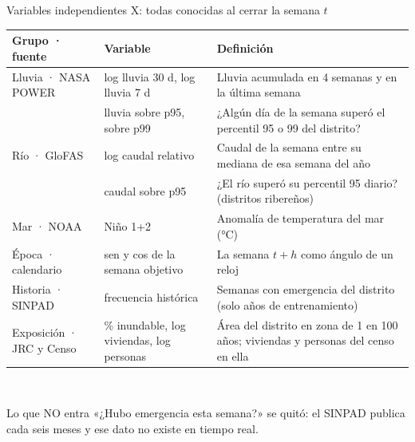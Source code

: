 \documentclass[aspectratio=169,11pt]{beamer}
\begin{document}
\begin{frame}{Variables independientes X: todas conocidas al cerrar la semana $t$}
\tiny
\begin{tabularx}{\textwidth}{@{}l l X@{}}
\toprule
\textbf{Grupo · fuente} & \textbf{Variable} & \textbf{Definición}\\\midrule
Lluvia · NASA POWER & log lluvia 30 d, log lluvia 7 d & Lluvia acumulada en 4 semanas y en la última semana\\
 & lluvia sobre p95, sobre p99 & ¿Algún día de la semana superó el percentil 95 o 99 del distrito?\\
Río · GloFAS & log caudal relativo & Caudal de la semana entre su mediana de esa semana del año\\
 & caudal sobre p95 & ¿El río superó su percentil 95 diario? (distritos ribereños)\\
Mar · NOAA & Niño 1+2 & Anomalía de temperatura del mar (°C)\\
Época · calendario & sen y cos de la semana objetivo & La semana $t+h$ como ángulo de un reloj\\
Historia · SINPAD & frecuencia histórica & Semanas con emergencia del distrito (solo años de entrenamiento)\\
Exposición · JRC y Censo & \% inundable, log viviendas, log personas & Área del distrito en zona de 1 en 100 años; viviendas y personas del censo en ella\\\bottomrule
\end{tabularx}\\[6pt]
\begin{caja}[naranja]{Lo que NO entra}
«¿Hubo emergencia esta semana?» se quitó: el SINPAD publica cada seis meses y ese dato no existe en tiempo real.
\end{caja}
\end{frame}
\end{document}
